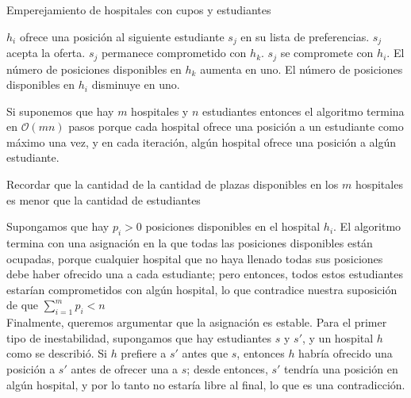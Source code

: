 \documentclass{article}
\begin{document}
\begin{algorithm}
\caption{Emperejamiento de hospitales con cupos y estudiantes}\label{alg:cap}
\begin{algorithmic}
    \State $h_i$ ofrece una posición al siguiente estudiante $s_j$ en su lista de preferencias.
        \State $s_j$ acepta la oferta.
    \Else
            \State $s_j$ permanece comprometido con $h_k$.
        \Else
            \State $s_j$ se compromete con $h_i$.
            \State El número de posiciones disponibles en $h_k$ aumenta en uno.
            \State El número de posiciones disponibles en $h_i$ disminuye en uno.
        \EndIf
    \EndIf
\EndWhile
\end{algorithmic}
\end{algorithm}

Si suponemos que hay $m$ hospitales y $n$ estudiantes entonces el algoritmo termina en $\mathcal{O}(mn)$ pasos porque cada hospital ofrece una posición a un estudiante como máximo una vez, y en cada iteración, algún hospital ofrece una posición a algún estudiante.

\begin{tcolorbox}[colback=red!5!white, colframe=red!50!black]
    Recordar que la cantidad de la cantidad de plazas disponibles en los $m$ hospitales es menor que la cantidad de estudiantes
\end{tcolorbox}

Supongamos que hay $p_i > 0$ posiciones disponibles en el hospital $h_i$. El algoritmo termina con una asignación en la que todas las posiciones disponibles están ocupadas, porque cualquier hospital que no haya llenado todas sus posiciones debe haber ofrecido una a cada estudiante; pero entonces, todos estos estudiantes estarían comprometidos con algún hospital, lo que contradice nuestra suposición de que $\sum_{i=1}^{m} p_i < n$ \\

Finalmente, queremos argumentar que la asignación es estable. Para el primer tipo de inestabilidad, supongamos que hay estudiantes $s$ y $s'$, y un hospital $h$ como se describió. Si $h$ prefiere a $s'$ antes que $s$, entonces $h$ habría ofrecido una posición a $s'$ antes de ofrecer una a $s$; desde entonces, $s'$ tendría una posición en algún hospital, y por lo tanto no estaría libre al final, lo que es una contradicción.\\
\end{document}
